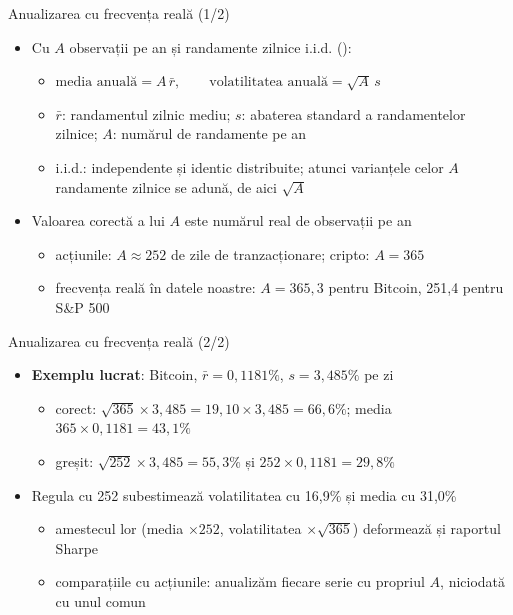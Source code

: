 \begin{frame}{Anualizarea cu frecvența reală (1/2)}
\itemsize{\small}
\begin{itemize}
    \item Cu $A$ observații pe an și randamente zilnice i.i.d. ():
    \begin{itemize}
        \item $\text{media anuală} = A\,\bar r, \qquad \text{volatilitatea anuală} = \sqrt{A}\,s$
        \item $\bar r$: randamentul zilnic mediu; $s$: abaterea standard a randamentelor zilnice; $A$: numărul de randamente pe an
        \item i.i.d.: independente și identic distribuite; atunci varianțele celor $A$ randamente zilnice se adună, de aici $\sqrt{A}$
    \end{itemize}
    \item Valoarea corectă a lui $A$ este numărul real de observații pe an
    \begin{itemize}
        \item acțiunile: $A \approx 252$ de zile de tranzacționare; cripto: $A = 365$
        \item frecvența reală în datele noastre: $A = 365{,}3$ pentru Bitcoin, 251{,}4 pentru S\&P 500
    \end{itemize}
\end{itemize}
\end{frame}

\begin{frame}{Anualizarea cu frecvența reală (2/2)}
\itemsize{\small}
\begin{itemize}
    \item \textbf{Exemplu lucrat}: Bitcoin, $\bar r = 0{,}1181\%$, $s = 3{,}485\%$ pe zi
    \begin{itemize}
        \item corect: $\sqrt{365} \times 3{,}485 = 19{,}10 \times 3{,}485 = 66{,}6\%$; media $365 \times 0{,}1181 = 43{,}1\%$
        \item greșit: $\sqrt{252} \times 3{,}485 = 55{,}3\%$ și $252 \times 0{,}1181 = 29{,}8\%$
    \end{itemize}
    \item Regula cu 252 subestimează volatilitatea cu 16{,}9\% și media cu 31{,}0\%
    \begin{itemize}
        \item amestecul lor (media $\times 252$, volatilitatea $\times\sqrt{365}$) deformează și raportul Sharpe
        \item comparațiile cu acțiunile: anualizăm fiecare serie cu propriul $A$, niciodată cu unul comun
    \end{itemize}
\end{itemize}
\end{frame}

